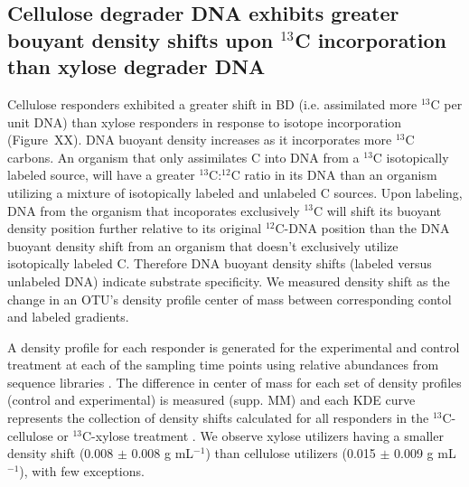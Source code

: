 \subsection{Cellulose degrader DNA exhibits greater bouyant density shifts upon
$^{13}$C incorporation than xylose degrader DNA} 
Cellulose responders exhibited a greater shift in BD (i.e. assimilated more
$^{13}$C per unit DNA) than xylose responders in response to isotope
incorporation (Figure~XX).  DNA buoyant density increases as it incorporates
more $^{13}$C carbons. An organism that only assimilates C into DNA from a
$^{13}$C isotopically labeled source, will have a greater $^{13}$C:$^{12}$C
ratio in its DNA than an organism utilizing a mixture of isotopically labeled
and unlabeled C sources. Upon labeling, DNA from the organism that incoporates
exclusively $^{13}$C will shift its buoyant density position further relative
to its original $^{12}$C-DNA position than the DNA buoyant density shift from
an organism that doesn't exclusively utilize isotopically labeled C. Therefore
DNA buoyant density shifts (labeled versus unlabeled DNA) indicate substrate
specificity.  We measured density shift as the change in an OTU's density
profile center of mass between corresponding contol and labeled gradients.

A density profile for each responder is generated for the experimental and
control treatment at each of the sampling time points using relative abundances
from sequence libraries . The difference in center of mass for each set of
density profiles (control and experimental) is measured (supp. MM) and each KDE
curve represents the collection of density shifts calculated for all responders
in the $^{13}$C-cellulose or $^{13}$C-xylose treatment . We observe xylose
utilizers having a smaller density shift (0.008 $\pm$ 0.008 g mL$^{-1}$) than
cellulose utilizers (0.015 $\pm$ 0.009 g mL$^{-1}$), with few exceptions. 

